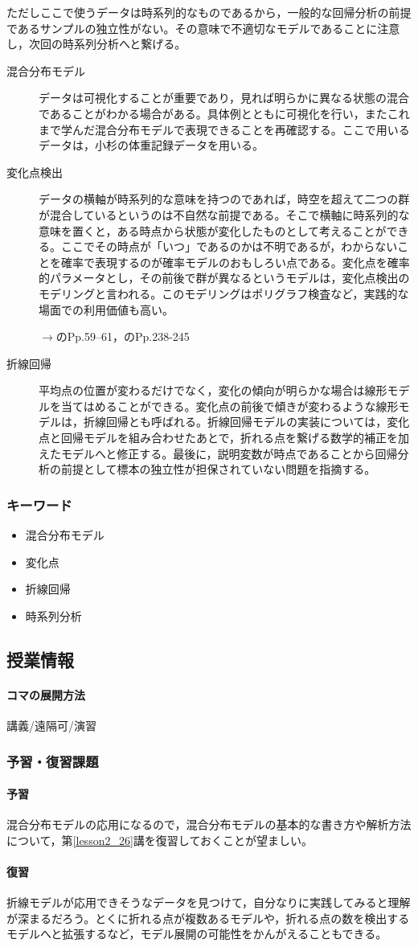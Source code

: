 ただしここで使うデータは時系列的なものであるから，一般的な回帰分析の前提であるサンプルの独立性がない。その意味で不適切なモデルであることに注意し，次回の時系列分析へと繋げる。
\begin{description}
	\item[混合分布モデル] データは可視化することが重要であり，見れば明らかに異なる状態の混合であることがわかる場合がある。具体例とともに可視化を行い，またこれまで学んだ混合分布モデルで表現できることを再確認する。ここで用いるデータは，小杉の体重記録データを用いる。
	\item[変化点検出] データの横軸が時系列的な意味を持つのであれば，時空を超えて二つの群が混合しているというのは不自然な前提である。そこで横軸に時系列的な意味を置くと，ある時点から状態が変化したものとして考えることができる。ここでその時点が「いつ」であるのかは不明であるが，わからないことを確率で表現するのが確率モデルのおもしろい点である。変化点を確率的パラメータとし，その前後で群が異なるというモデルは，変化点検出のモデリングと言われる。このモデリングはポリグラフ検査など，実践的な場面での利用価値も高い。
	      \begin{flushright}
		      $\to$\citet{Lee201709}のPp.59--61，\citet{Matsuura201610}のPp.238-245
	      \end{flushright}
	\item[折線回帰] 平均点の位置が変わるだけでなく，変化の傾向が明らかな場合は線形モデルを当てはめることができる。変化点の前後で傾きが変わるような線形モデルは，折線回帰とも呼ばれる。折線回帰モデルの実装については，変化点と回帰モデルを組み合わせたあとで，折れる点を繋げる数学的補正を加えたモデルへと修正する。最後に，説明変数が時点であることから回帰分析の前提として標本の独立性が担保されていない問題を指摘する。
\end{description}
\subsubsection{キーワード}
\begin{itemize}
	\item 混合分布モデル
	\item 変化点
	\item 折線回帰
	\item 時系列分析
\end{itemize}
\subsection{授業情報}
\paragraph{コマの展開方法}
講義/遠隔可/演習
\subsubsection{予習・復習課題}
\paragraph{予習}混合分布モデルの応用になるので，混合分布モデルの基本的な書き方や解析方法について，第\ref{lesson2_26}講を復習しておくことが望ましい。
\paragraph{復習}折線モデルが応用できそうなデータを見つけて，自分なりに実践してみると理解が深まるだろう。とくに折れる点が複数あるモデルや，折れる点の数を検出するモデルへと拡張するなど，モデル展開の可能性をかんがえることもできる。
